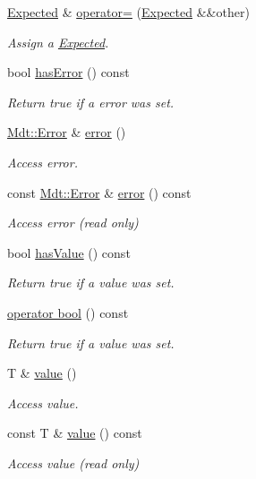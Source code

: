 \begin{DoxyCompactItemize}
\hyperlink{class_mdt_1_1_expected}{Expected} \& \hyperlink{class_mdt_1_1_expected_a2c8f56f9a45c4b9b70ae2c7eadb2b96d}{operator=} (\hyperlink{class_mdt_1_1_expected}{Expected} \&\&other)
\begin{DoxyCompactList}\small\item\em Assign a \hyperlink{class_mdt_1_1_expected}{Expected}. \end{DoxyCompactList}\item 
bool \hyperlink{class_mdt_1_1_expected_acddb65fce2a9823e36663cbca8eaadc5}{has\+Error} () const 
\begin{DoxyCompactList}\small\item\em Return true if a error was set. \end{DoxyCompactList}\item 
\hyperlink{class_mdt_1_1_error}{Mdt\+::\+Error} \& \hyperlink{class_mdt_1_1_expected_a4e144dbc496a80e289f32f845aefcf5c}{error} ()
\begin{DoxyCompactList}\small\item\em Access error. \end{DoxyCompactList}\item 
const \hyperlink{class_mdt_1_1_error}{Mdt\+::\+Error} \& \hyperlink{class_mdt_1_1_expected_aecfcbc42443c3a2267d8d7c49e6282e8}{error} () const 
\begin{DoxyCompactList}\small\item\em Access error (read only) \end{DoxyCompactList}\item 
bool \hyperlink{class_mdt_1_1_expected_a8e75fd1c7205ad0fedac14223312c09e}{has\+Value} () const 
\begin{DoxyCompactList}\small\item\em Return true if a value was set. \end{DoxyCompactList}\item 
\hyperlink{class_mdt_1_1_expected_aa88e1919edb8b192abab69bffadf660e}{operator bool} () const 
\begin{DoxyCompactList}\small\item\em Return true if a value was set. \end{DoxyCompactList}\item 
T \& \hyperlink{class_mdt_1_1_expected_a744546093eb011f8d3964d749a3cbea3}{value} ()
\begin{DoxyCompactList}\small\item\em Access value. \end{DoxyCompactList}\item 
const T \& \hyperlink{class_mdt_1_1_expected_a290f2b4456b100e7066a453ffe7e94e8}{value} () const 
\begin{DoxyCompactList}\small\item\em Access value (read only) \end{DoxyCompactList}\end{DoxyCompactItemize}


